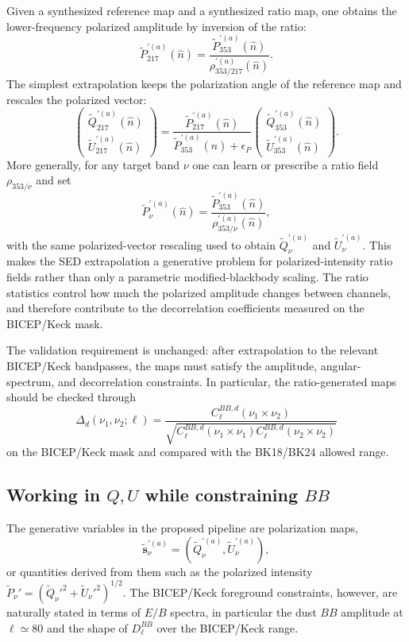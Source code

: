 \documentclass[11pt]{article}
\begin{document}
Given a synthesized reference map and a synthesized ratio map, one obtains the
lower-frequency polarized amplitude by inversion of the ratio:
\[
  \tilde P_{217}^{\prime(a)}(\hat n)
  =
  \frac{
    \tilde P_{353}^{\prime(a)}(\hat n)
  }{
    \rho_{353/217}^{\prime(a)}(\hat n)
  }.
\]
The simplest extrapolation keeps the polarization angle of the reference map
and rescales the polarized vector:
\[
  \begin{pmatrix}
    \tilde Q_{217}^{\prime(a)}(\hat n) \\
    \tilde U_{217}^{\prime(a)}(\hat n)
  \end{pmatrix}
  =
  \frac{
    \tilde P_{217}^{\prime(a)}(\hat n)
  }{
    \tilde P_{353}^{\prime(a)}(\hat n)+\epsilon_P
  }
  \begin{pmatrix}
    \tilde Q_{353}^{\prime(a)}(\hat n) \\
    \tilde U_{353}^{\prime(a)}(\hat n)
  \end{pmatrix}.
\]
More generally, for any target band $\nu$ one can learn or prescribe a ratio
field $\rho_{353/\nu}$ and set
\[
  \tilde P_{\nu}^{\prime(a)}(\hat n)
  =
  \frac{
    \tilde P_{353}^{\prime(a)}(\hat n)
  }{
    \rho_{353/\nu}^{\prime(a)}(\hat n)
  },
\]
with the same polarized-vector rescaling used to obtain
$\tilde Q_\nu^{\prime(a)}$ and $\tilde U_\nu^{\prime(a)}$.  This makes the SED
extrapolation a generative problem for polarized-intensity ratio fields rather
than only a parametric modified-blackbody scaling.  The ratio statistics
control how much the polarized amplitude changes between channels, and
therefore contribute to the decorrelation coefficients measured on the
BICEP/Keck mask.

The validation requirement is unchanged: after extrapolation to the relevant
BICEP/Keck bandpasses, the maps must satisfy the amplitude, angular-spectrum,
and decorrelation constraints.  In particular, the ratio-generated maps should
be checked through
\[
  \Delta_d(\nu_1,\nu_2;\ell)
  =
  \frac{
    C_\ell^{BB,d}(\nu_1\times\nu_2)
  }{
    \sqrt{
      C_\ell^{BB,d}(\nu_1\times\nu_1)
      C_\ell^{BB,d}(\nu_2\times\nu_2)
    }
  }
\]
on the BICEP/Keck mask and compared with the BK18/BK24 allowed range.

\subsection{Working in $Q,U$ while constraining $BB$}

The generative variables in the proposed pipeline are polarization maps,
\[
  \tilde{\bm s}_{\nu}^{\prime(a)}
  =
  \left(
    \tilde Q_{\nu}^{\prime(a)},
    \tilde U_{\nu}^{\prime(a)}
  \right),
\]
or quantities derived from them such as the polarized intensity
$\tilde P_\nu'=(\tilde Q_\nu'^2+\tilde U_\nu'^2)^{1/2}$.  The BICEP/Keck
foreground constraints, however, are naturally stated in terms of $E/B$
spectra, in particular the dust $BB$ amplitude at $\ell\simeq80$ and the
shape of $D_\ell^{BB}$ over the BICEP/Keck range.
\end{document}
